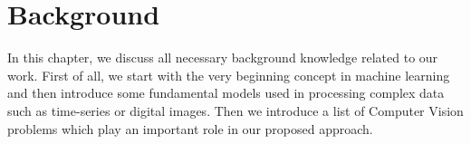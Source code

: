 \chapter{Background}
\label{chap-background}
\begin{ChapAbstract}
In this chapter, we discuss all necessary background knowledge related to our work. First of all, we start with the very beginning concept in machine learning and then introduce some fundamental models used in processing complex data such as time-series or digital images. Then we introduce a list of Computer Vision problems which play an important role in our proposed approach. 
\end{ChapAbstract}










